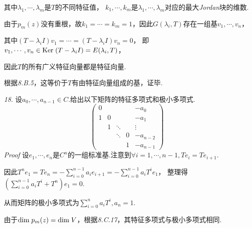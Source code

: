 其中\(\lambda_1,\cdots,\lambda_m\)是\(T\)的不同特征值，
\(k_1,\cdots,k_m\)是\(\lambda_1,\cdots,\lambda_m\)对应的最大\textit{Jordan}块的维数.

由于\(p_m(z)\)没有重根，故\(k_1=\cdots=k_m=1\)，因此\(G(\lambda_i,T)\)存在一组基\(v_1,\cdots,v_n\)，

其中\((T-\lambda_i I)v_1=\cdots=(T-\lambda_i I)v_n=0\)，
即\(v_1,\cdots,v_n \in \mathrm{Ker \;} (T-\lambda_i I)=E(\lambda_i,T)\)，

因此\(T\)的所有广义特征向量都是特征向量.

根据\textit{8.B.5}，这等价于\(T\)有由特征向量组成的基，证毕.

\hspace*{\fill}

\textit{18.}
设\(a_0,\cdots,a_{n-1} \in C\).给出以下矩阵的特征多项式和极小多项式.
    \begin{equation*}
        \begin{pmatrix}
            0 &   &        &   & -a_0     \\
            1 & 0 &        &   & -a_1     \\
              & 1 & \ddots &   & \vdots   \\
              &   & \ddots & 0 & -a_{n-2} \\
              &   &        & 1 & -a_{n-1} 
        \end{pmatrix}
    \end{equation*}
\textit{Proof}
设\(e_1,\cdots,e_n\)是\(C^n\)的一组标准基.注意到\(\forall i=1,\cdots,n-1,Te_i=Te_{i+1}\).

因此\(T^n e_1=Te_n=-\sum_{i=0}^{n-1}a_ie_{i+1}=-\sum_{i=0}^{n-1}a_iT^ie_1\)，
整理得\((\sum_{i=0}^{n-1}a_iT^i+T^n)e_1=0\).

从而矩阵的极小多项式为\(\sum_{i=0}^n a_iT^i,a_n=1\).

由于\(\mathrm{dim \;} p_m(z)=\mathrm{dim \;} V\)，根据\textit{8.C.17}，其特征多项式与极小多项式相同.

